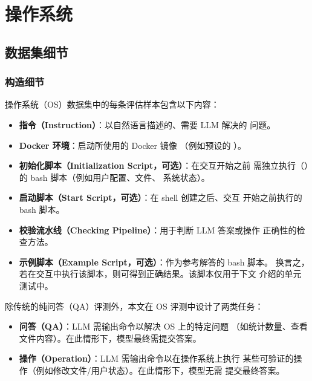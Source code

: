 
\section{操作系统}\label{app:os}

\subsection{数据集细节}

\subsubsection*{构造细节}

操作系统（OS）数据集中的每条评估样本包含以下内容：
\begin{itemize}
    \item \textbf{指令（Instruction）}：以自然语言描述的、需要 LLM 解决的
          问题。
    \item \textbf{Docker 环境}：启动所使用的 Docker 镜像
          （例如预设的 ）。
    \item \textbf{初始化脚本（Initialization Script，可选）}：在交互开始之前
          需独立执行（）的 bash 脚本（例如用户配置、文件、
          系统状态）。
    \item \textbf{启动脚本（Start Script，可选）}：在 shell 创建之后、交互
          开始之前执行的 bash 脚本。
    \item \textbf{校验流水线（Checking Pipeline）}：用于判断 LLM 答案或操作
          正确性的检查方法。
    \item \textbf{示例脚本（Example Script，可选）}：作为参考解答的 bash 脚本。
          换言之，若在交互中执行该脚本，则可得到正确结果。该脚本仅用于下文
          介绍的单元测试中。
\end{itemize}

除传统的纯问答（QA）评测外，本文在 OS 评测中设计了两类任务：
\begin{itemize}
    \item \textbf{问答（QA）}：LLM 需输出命令以解决 OS 上的特定问题
          （如统计数量、查看文件内容）。在此情形下，模型最终需提交答案。
    \item \textbf{操作（Operation）}：LLM 需输出命令以在操作系统上执行
          某些可验证的操作（例如修改文件/用户状态）。在此情形下，模型无需
          提交最终答案。
\end{itemize}

